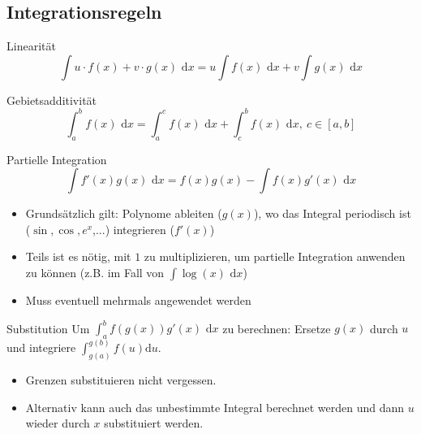 \documentclass[a4paper,10pt]{article}
\def\dx{\text{ d}x}
\begin{document}
\subsection{Integrationsregeln}
\begin{subbox}{Linearität}
 \vspace{-12pt}
 $$\int u\cdot f(x) + v \cdot g(x) \dx = u \int f(x) \dx + v \int g(x) \dx$$
\end{subbox}
\begin{subbox}{Gebietsadditivität}
 \vspace{-12pt}
 $$\int_a^b f(x) \dx = \int_a^c f(x) \dx + \int_c^b f(x) \dx, \ c \in [a,b]$$
\end{subbox}
\begin{mainbox}{Partielle Integration}
 \vspace{-12pt}
 $$\int f'(x) g(x) \dx = f(x)g(x) - \int f(x) g'(x) \dx$$
\end{mainbox}
\begin{itemize}
 \item Grundsätzlich gilt: Polynome ableiten ($g(x)$), wo das Integral periodisch ist ($\sin, \cos, e^x$,...) integrieren ($f'(x)$)
 \item Teils ist es nötig, mit $1$ zu multiplizieren, um partielle Integration anwenden zu können (z.B. im Fall von $\int \log(x) \dx$)
 \item Muss eventuell mehrmals angewendet werden
\end{itemize}
\begin{mainbox}{Substitution}
 Um $\int_a^b f(g(x))g'(x) \dx$ zu berechnen: Ersetze $g(x)$ durch $u$ und integriere $\int_{g(a)}^{g(b)} f(u) \text{d}u$.
\end{mainbox}
\begin{itemize}
 \item Grenzen substituieren nicht vergessen.
 \item Alternativ kann auch das unbestimmte Integral berechnet werden und dann $u$ wieder durch $x$ substituiert werden.
\end{itemize}
\end{document}
